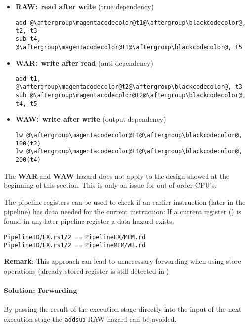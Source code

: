 \begin{multicols*}{2}
    \begin{itemize}
        \item \textbf{RAW:\ read after write} (true dependency)
              \begin{lstlisting}[escapechar=@]
add @\aftergroup\magentacodecolor@t1@\aftergroup\blackcodecolor@, t2, t3
sub t4, @\aftergroup\magentacodecolor@t1@\aftergroup\blackcodecolor@, t5
\end{lstlisting}
        \item \textbf{WAR:\ write after read} (anti dependency)
              \begin{lstlisting}[escapechar=@]
add t1, @\aftergroup\magentacodecolor@t2@\aftergroup\blackcodecolor@, t3
sub @\aftergroup\magentacodecolor@t2@\aftergroup\blackcodecolor@, t4, t5
\end{lstlisting}
        \item \textbf{WAW:\ write after write} (output dependency)
              \begin{lstlisting}[escapechar=@]
lw @\aftergroup\magentacodecolor@t1@\aftergroup\blackcodecolor@, 100(t2)
lw @\aftergroup\magentacodecolor@t1@\aftergroup\blackcodecolor@, 200(t4)
\end{lstlisting}
    \end{itemize}

    The \textbf{WAR} and \textbf{WAW} hazard does not apply to the design showed at the beginning of this section. This is only an issue for out-of-order CPU's.

    \newpar{}

    The pipeline registers can be used to check if an earlier instruction (later in the pipeline) has data needed for the current instruction:
    If a current  register () is found in any later pipeline register a data hazard exists.
    \begin{lstlisting}
PipelineID/EX.rs1/2 == PipelineEX/MEM.rd
PipelineID/EX.rs1/2 == PipelineMEM/WB.rd
    \end{lstlisting}
    \textbf{Remark}: This approach can lead to unnecessary forwarding when using store operations (already stored register is still detected in )

    \paragraph{Solution: Forwarding}
    By passing the result of the execution stage directly into the input of the next execution stage the \texttt{add}\textleftarrow\texttt{sub} RAW hazard can be avoided.


\end{multicols*}
